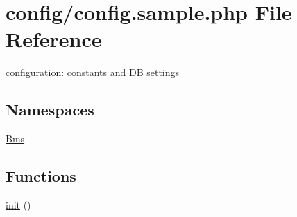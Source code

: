 \hypertarget{config_8sample_8php}{}\section{config/config.sample.\+php File Reference}
\label{config_8sample_8php}


configuration\+: constants and DB settings  


\subsection*{Namespaces}
\begin{DoxyCompactItemize}
\item 
 \hyperlink{namespace_bms}{Bms}
\end{DoxyCompactItemize}
\subsection*{Functions}
\begin{DoxyCompactItemize}
\item 
\hyperlink{namespace_bms_a72bf47280fcd5e7b7521cecc39ffe509}{init} ()
\end{DoxyCompactItemize}
